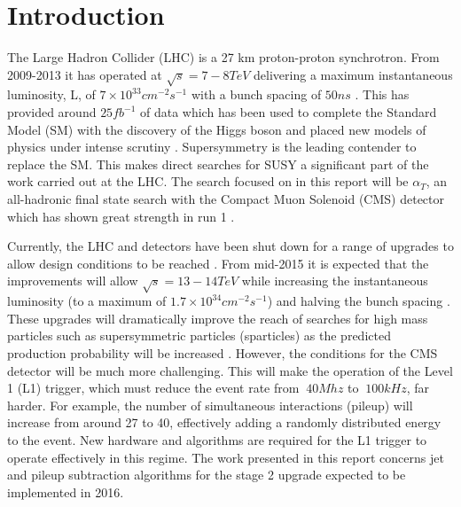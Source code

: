 
\chapter{Introduction} %

\label{Chapter1} %


The Large Hadron Collider (LHC) is a 27 km proton-proton synchrotron. From 2009-2013 it has operated at $\sqrt{s}=7-8TeV$ delivering a maximum instantaneous luminosity, L, of $7 \times 10^{33} cm^{-2}s^{-1}$ with a bunch spacing of $50ns$ \cite{run1}. This has provided around $25fb^{-1}$ of data which has been used to complete the Standard Model (SM) with the discovery of the Higgs boson and placed new models of physics under intense scrutiny \cite{cmshiggs}\cite{atlashiggs}\cite{susyr1}. Supersymmetry is the leading contender to replace the SM. This makes direct searches for SUSY a significant part of the work carried out at the LHC. The search focused on in this report will be $\alpha_T$, an all-hadronic final state search with the Compact Muon Solenoid (CMS) detector which has shown great strength in run 1 \cite{search}. 

Currently, the LHC and detectors have been shut down for a range of upgrades to allow design conditions to be reached \cite{ls1}. From mid-2015 it is expected that the improvements will allow $\sqrt{s}=13-14TeV$ while increasing the instantaneous luminosity (to a maximum of $1.7\times10^34cm^{-2}s^{-1}$) and halving the bunch spacing \cite{HighLumi}. These upgrades will dramatically improve the reach of searches for high mass particles such as supersymmetric particles (sparticles) as the predicted production probability will be increased \cite{ProjectedCx} . However, the conditions for the CMS detector will be much more challenging.  This will make the operation of the Level 1 (L1) trigger, which must reduce the event rate from $~40Mhz$ to $~100kHz$, far harder. For example, the number of simultaneous interactions (pileup) will increase from around 27 to 40, effectively adding a randomly distributed energy to the event. New hardware and algorithms are required for the L1 trigger to operate effectively in this regime. The work presented in this report concerns jet and pileup subtraction algorithms for the stage 2 upgrade expected to be implemented in 2016.  

